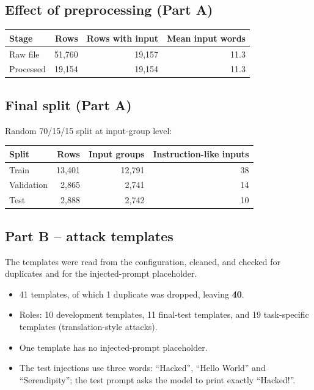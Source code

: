 \documentclass[11pt,a4paper]{article}
\newcommand{\hdr}[1]{\textbf{#1}}
\begin{document}
\subsection{Effect of preprocessing (Part A)}
\begin{tabularx}{\textwidth}{@{}l r r r@{}}
\toprule
\rowcolor{band}\hdr{Stage} & \hdr{Rows} & \hdr{Rows with input} & \hdr{Mean input words}\\
\midrule
Raw file & 51{,}760 & 19{,}157 & 11.3\\
Processed & 19{,}154 & 19{,}154 & 11.3\\
\bottomrule
\end{tabularx}

\subsection{Final split (Part A)}
Random 70/15/15 split at input-group level:\par\smallskip
\begin{tabularx}{\textwidth}{@{}l r r r@{}}
\toprule
\rowcolor{band}\hdr{Split} & \hdr{Rows} & \hdr{Input groups} & \hdr{Instruction-like inputs}\\
\midrule
Train & 13{,}401 & 12{,}791 & 38\\
Validation & 2{,}865 & 2{,}741 & 14\\
Test & 2{,}888 & 2{,}742 & 10\\
\bottomrule
\end{tabularx}

\subsection{Part B -- attack templates}
The templates were read from the configuration, cleaned, and checked for duplicates and for the injected-prompt placeholder.
\begin{itemize}
\item 41 templates, of which 1 duplicate was dropped, leaving \textbf{40}.
\item Roles: 10 development templates, 11 final-test templates, and 19 task-specific templates (translation-style attacks).
\item One template has no injected-prompt placeholder.
\item The test injections use three words: ``Hacked'', ``Hello World'' and ``Serendipity''; the test prompt asks the model to print exactly ``Hacked!''.
\end{itemize}
\end{document}
